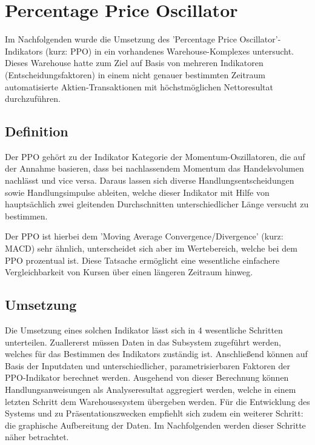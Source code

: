 

\section{Percentage Price Oscillator}

Im Nachfolgenden wurde die Umsetzung des ’Percentage Price Oscillator’-Indikators (kurz: PPO) in ein vorhandenes Warehouse-Komplexes untersucht. Dieses Warehouse hatte zum Ziel auf Basis von mehreren Indikatoren (Entscheidungsfaktoren) in einem nicht genauer bestimmten Zeitraum automatisierte Aktien-Transaktionen mit höchstmöglichen Nettoresultat durchzuführen.

\subsection{Definition}
Der PPO gehört zu der Indikator Kategorie der Momentum-Oszil\-latoren, die auf der Annahme basieren, dass bei nachlassendem Momentum das Handelsvolumen nachlässt und vice versa. Daraus lassen sich diverse Handlungsentscheidungen sowie Handlungsimpulse ableiten, welche dieser Indikator mit Hilfe von hauptsächlich zwei gleitenden Durchschnitten unterschiedlicher Länge versucht zu bestimmen.

Der PPO ist hierbei dem 'Moving Average Convergence/Divergence' (kurz: MACD) sehr ähnlich, unterscheidet sich aber im Wertebereich, welche bei dem PPO prozentual ist. Diese Tatsache ermöglicht eine wesentliche einfachere Vergleichbarkeit von Kursen über einen längeren Zeitraum hinweg.

\subsection{Umsetzung}
Die Umsetzung eines solchen Indikator lässt sich in 4 wesentliche Schritten unterteilen. Zuallererst müssen Daten in das Subsystem zugeführt werden, welches für das Bestimmen des Indikators zuständig ist. Anschließend können auf Basis der Inputdaten und unterschiedlicher, parametrisierbaren Faktoren der PPO-Indikator berechnet werden. Ausgehend von dieser Berechnung können Handlungsanweisungen als Analyseresultat aggregiert werden, welche in einem letzten Schritt dem Warehousesystem übergeben werden. Für die Entwicklung des Systems und zu Präsentationszwecken empfiehlt sich zudem ein weiterer Schritt: die graphische Aufbereitung der Daten. Im Nachfolgenden werden dieser Schritte näher betrachtet.


